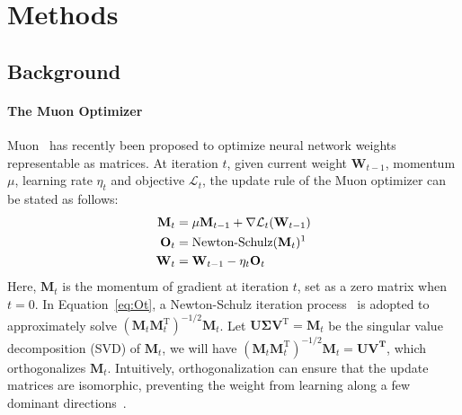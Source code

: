 \section{Methods}

\subsection{Background}

\paragraph{The Muon Optimizer}
\label{sec:analysis:background}
Muon~\citep{jordan2024muon} has recently been proposed to optimize neural network weights representable as matrices. At iteration $t$, given current weight $\mathbf{W}_{t-1}$, momentum $\mu$, learning rate $\eta_t$ and objective $\mathcal{L}_t$, the update rule of the Muon optimizer can be stated as follows:
\begin{align}
    \mathbf{M}_t &= \mu \mathbf{M}_{t-1} + \nabla\mathcal{L}_t(\mathbf{W}_{t-1}) \notag \\
    \mathbf{O}_t &= \text{Newton-Schulz}(\mathbf{M}_t)\text{\footnotemark[1]} \label{eq:Ot}\\
    \mathbf{W}_t &= \mathbf{W}_{t-1} - \eta_t \mathbf{O}_t \notag
\end{align}
 Here, $\mathbf{M}_t$ is the momentum of gradient at iteration $t$, set as a zero matrix when $t = 0$. In Equation~\ref{eq:Ot}, a Newton-Schulz iteration process~\citep{bernstein2024oldoptimizernewnorm} is adopted to approximately solve $(\mathbf{M}_t \mathbf{M}^{\mathrm{T}}_t)^{-1/2}\mathbf{M}_t$. Let $\mathbf{U}\mathbf{\Sigma} \mathbf{V}^\mathrm{T} = \mathbf{M}_t$ be the singular value decomposition (SVD) of $\mathbf{M}_t$, we will have $(\mathbf{M}_t \mathbf{M}^{\mathrm{T}}_t)^{-1/2}\mathbf{M}_t = \mathbf{U}\mathbf{V^T}$, which orthogonalizes $\mathbf{M}_t$. Intuitively, orthogonalization can ensure that the update matrices are isomorphic, preventing the weight from learning along a few dominant directions~\citep{jordan2024muon}.

